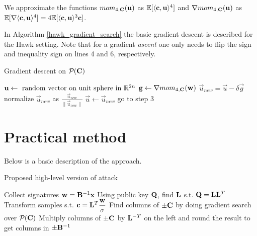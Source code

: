 We approximate the functions $mom_{4, \mathbf{C}}(\mathbf{u})$ as $\mathbb{E} [\langle \mathbf{c}, \mathbf{u} \rangle ^4]$ and $\nabla mom_{4,\mathbf{C}}(\mathbf{u})$ as $\mathbb{E} [\nabla \langle \mathbf{c}, \mathbf{u} \rangle ^4] = 4 \mathbb{E} [\langle \mathbf{c}, \mathbf{u} \rangle ^3 \mathbf{c}]$.

In Algorithm \ref{hawk_gradient_search} the basic gradient descent is described for the Hawk setting. Note that 
for a gradient \textit{ascent} one only needs to flip the sign and inequality sign on lines 4 and 6, respectively.
\begin{algorithm}[H]
    \caption{Gradient descent on $\mathcal{P}_{}(\mathbf{C})$}\label{hawk_gradient_search}
\begin{algorithmic}[1]
    \State $\mathbf{u} \gets \text{ random vector on unit sphere in } \mathbb{R}^{2n}$
    \Loop
    \State $\mathbf{g} \gets \nabla mom_{4, \mathbf{C}}(\mathbf{w})$
    \State $\vec{u}_{new} = \vec{u} - \delta \vec{g}$
    \State normalize $\vec{u}_{new}$ as $\frac{\vec{u}_{new}}{\lVert \vec{u}_{new} \rVert}$
    \State {}
    \Else 
    \State $\vec{u} \gets \vec{u}_{new}$
    \State go to step 3
    \EndIf
    \EndLoop
\end{algorithmic}
\end{algorithm}

\section{Practical method}

Below is a basic description of the approach.
\begin{algorithm}[H]
\caption{Proposed high-level version of attack}
\begin{algorithmic}[1]
    \State Collect signatures $\mathbf{w} = \mathbf{B}^{-1} \mathbf{x}$
    \State Using public key $\mathbf{Q}$, find $\mathbf{L}$ s.t. $\mathbf{Q} = \mathbf{L} \mathbf{L}^T$
    \State Transform samples s.t. $\vec{c} = \mat{L}^T \mathlarger{\frac{\vec{w}}{\sigma}}$
    \State Find columns of $\pm \mathbf{C}$ by doing gradient search over $\mathcal{P}_{}(\mathbf{C})$
    \State Multiply columns of $\pm \mathbf{C}$ by $\mathbf{L}^{-T}$ on the left and round the result to get columns in $\pm \mathbf{B}^{-1}$
\end{algorithmic}
\end{algorithm}

